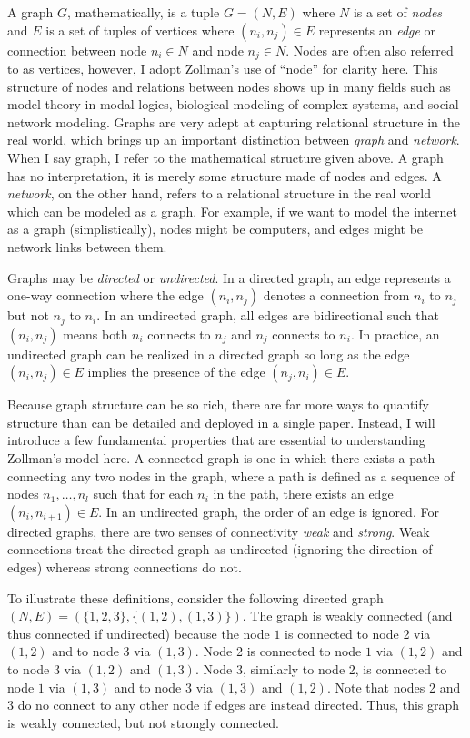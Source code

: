 A graph \(G\), mathematically, is a tuple \(G = (N, E)\) where \(N\) is
a set of \emph{nodes} and \(E\) is a set of tuples of vertices where
\((n_i, n_j) \in E\) represents an \emph{edge} or connection between
node \(n_i \in N\) and node \(n_j \in N\). Nodes are often also referred
to as vertices, however, I adopt Zollman's use of ``node'' for clarity
here. This structure of nodes and relations between nodes shows up in
many fields such as model theory in modal logics, biological modeling of
complex systems, and social network modeling. Graphs are very adept at
capturing relational structure in the real world, which brings up an
important distinction between \emph{graph} and \emph{network}. When I
say graph, I refer to the mathematical structure given above. A graph
has no interpretation, it is merely some structure made of nodes and
edges. A \emph{network}, on the other hand, refers to a relational
structure in the real world which can be modeled as a graph. For
example, if we want to model the internet as a graph (simplistically),
nodes might be computers, and edges might be network links between them.

Graphs may be \emph{directed} or \emph{undirected}. In a directed graph,
an edge represents a one-way connection where the edge \((n_i, n_j)\)
denotes a connection from \(n_i\) to \(n_j\) but not \(n_j\) to \(n_i\).
In an undirected graph, all edges are bidirectional such that
\((n_i, n_j)\) means both \(n_i\) connects to \(n_j\) and \(n_j\)
connects to \(n_i\). In practice, an undirected graph can be realized in
a directed graph so long as the edge \((n_i, n_j) \in E\) implies the
presence of the edge \((n_j, n_i) \in E\).

Because graph structure can be so rich, there are far more ways to
quantify structure than can be detailed and deployed in a single paper.
Instead, I will introduce a few fundamental properties that are
essential to understanding Zollman's model here. A connected graph is
one in which there exists a path connecting any two nodes in the graph,
where a path is defined as a sequence of nodes \(n_1, \ldots, n_l\) such
that for each \(n_i\) in the path, there exists an edge
\((n_i, n_{i+1}) \in E\). In an undirected graph, the order of an edge
is ignored. For directed graphs, there are two senses of connectivity
\emph{weak} and \emph{strong}. Weak connections treat the directed graph
as undirected (ignoring the direction of edges) whereas strong
connections do not.

To illustrate these definitions, consider the following directed graph
\((N, E) = \left(\{ 1, 2, 3 \}, \{ (1, 2), (1, 3) \}\right)\). The graph
is weakly connected (and thus connected if undirected) because the node
\(1\) is connected to node 2 via \((1, 2)\) and to node 3 via
\((1, 3)\). Node 2 is connected to node \(1\) via \((1, 2)\) and to node
3 via \((1, 2)\) and \((1, 3)\). Node 3, similarly to node 2, is
connected to node \(1\) via \((1, 3)\) and to node 3 via \((1, 3)\) and
\((1, 2)\). Note that nodes 2 and 3 do no connect to any other node if
edges are instead directed. Thus, this graph is weakly connected, but
not strongly connected.

